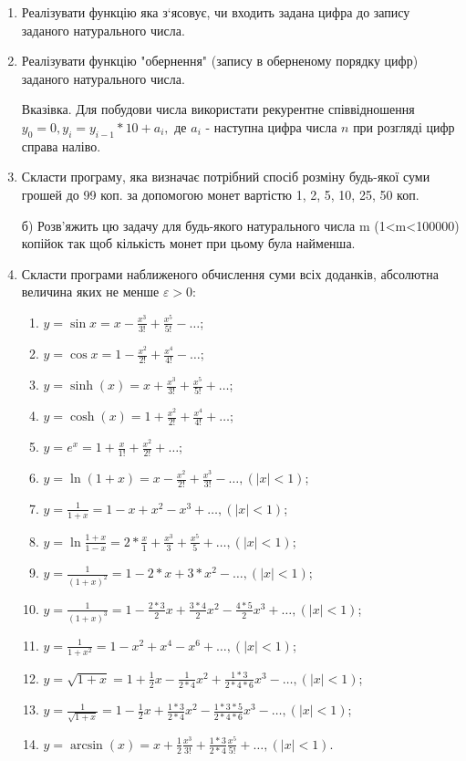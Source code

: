 \documentclass[]{article}
\makeatletter
\newcommand{\xslalph}[1]{\expandafter\@xslalph\csname c@#1\endcsname}
\newcommand{\@xslalph}[1]{%
    \ifcase#1\or а\or б\or в\or г\or д\or e\or є\or ж\or з\or i%
    \or й\or к\or л\or м\or н\or о\or п\or р\or с\or т%
    \or у\or ф\or х\or ц\or ч\or ш\or ю\or я\or аа\or бб\or вв %
    \else\@ctrerr\fi%
}
\makeatother
\begin{document}
\begin{enumerate}
\begin{enumerate}[label=\xslalph*)]
\end{enumerate}

\item
Реалізувати функцію яка з`ясовує, чи входить задана цифра до запису
заданого натурального числа.
\item
Реалізувати функцію "обернення" (запису в оберненому порядку цифр)
заданого натурального числа.

Вказівка. Для побудови числа використати рекурентне співвідношення
\(y_{0} = 0,y_{i} = y_{i - 1}*10 + a_{i},\) де \(a_{i}\) - наступна
цифра числа \(n\) при розгляді цифр справа наліво.

\item
Скласти програму, яка визначає потрібний спосіб розміну будь-якої суми
грошей до 99 коп. за допомогою монет вартістю 1, 2, 5, 10, 25, 50 коп.

б) Розв'яжить цю задачу для будь-якого натурального числа m
(1\textless{}m\textless{}100000) копійок так щоб кількість монет при
цьому була найменша.


\item
  Скласти програми наближеного обчислення суми всіх доданків, абсолютна
  величина яких не менше $\varepsilon > 0 $:
\begin{enumerate}[label=\xslalph*)]
\item \(y = \sin x = x - \frac{x^{3}}{3!} + \frac{x^{5}}{5!} - \ldots\);
\item \(y = \cos x = 1 - \frac{x^{2}}{2!} + \frac{x^{4}}{4!} - \ldots\);
\item
\(y = \sinh (x) = x + \frac{x^{3}}{3!} + \frac{x^{5}}{5!} + \ldots\);
\item 
\(y = \cosh (x) = 1 + \frac{x^{2}}{2!} + \frac{x^{4}}{4!} + \ldots\);
\item \(y = e^{x} = 1 + \frac{x}{1!} + \frac{x^{2}}{2!} + \ldots\);
\item
\(y = \ln(1 + x) = x - \frac{x^{2}}{2!} + \frac{x^{3}}{3!} - \ldots,(\left| x \right| < 1)\);
\item
\(y = \frac{1}{1 + x} = 1 - x + x^{2} - x^{3} + \ldots,(\left| x \right| < 1)\);
\item
\(y = \ln\frac{1 + x}{1 - x} = 2*\frac{x}{1} + \frac{x^{3}}{3} + \frac{x^{5}}{5} + \ldots, (\left| x \right| < 1)\);
\item
\(y = \frac{1}{(1 + x)^{2}} = 1 - 2*x + 3*x^{2} - \ldots,(\left| x \right| < 1)\);
\item
\(y = \frac{1}{(1 + x)^{3}} = 1 - \frac{2*3}{2}x + \frac{3*4}{2}x^{2} - \frac{4*5}{2}x^{3} + \ldots,(\left| x \right| < 1)\);
\item
\(y = \frac{1}{1 + x^{2}} = 1 - x^{2} + x^{4} - x^{6} + \ldots,(\left| x \right| < 1)\);
\item
\(y = \sqrt{1 + x} = 1 + \frac{1}{2}x - \frac{1}{2*4}x^{2} + \frac{1*3}{2*4*6}x^{3} - \ldots,(\left| x \right| < 1)\);
\item
\(y = \frac{1}{\sqrt{1 + x}} = 1 - \frac{1}{2}x + \frac{1*3}{2*4}x^{2} - \frac{1*3*5}{2*4*6}x^{3} - \ldots,(\left| x \right| < 1)\);
\item
\(y = \arcsin (x) = x + \frac{1}{2}\frac{x^{3}}{3!} + \frac{1*3}{2*4}\frac{x^{5}}{5!} + \ldots,(\left| x \right| < 1)\).


\end{enumerate}
\end{enumerate}
\end{document}
